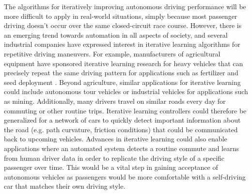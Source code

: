  The algorithms for iteratively improving autonomous driving performance will be more difficult to apply in real-world situations, simply because most passenger driving doesn't
 occur over the same closed-circuit race course. However, there is an emerging trend towards automation in all aspects of society, and several
 industrial companies have expressed interest in iterative learning algorithms for repetitive driving maneuvers. For example, manufacturers of 
 agricultural equipment have sponsored iterative learning research for heavy vehicles that can precisely repeat the same driving pattern for applications such as fertilizer
and seed deployment \cite{liuILI}. Beyond agriculture, similar applications for iterative learning could include autonomous tour vehicles or 
industrial vehicles for applications such as mining. Additionally, many drivers travel on similar roads every day for commuting or other routine
trips. Iterative learning controllers could therefore be generalized for a network of cars to quickly detect important information about the road (e.g. path curvature, friction conditions) that could
be communicated back to upcoming vehicles. Advances in iterative learning could also enable applications where an automated system detects a routine commute and learns from human driver data
in order to replicate the driving style of a specific passenger over time. This would be a vital step in gaining acceptance of autonomous vehicles as passengers
would be more comfortable with a self-driving car that matches their own driving style. 